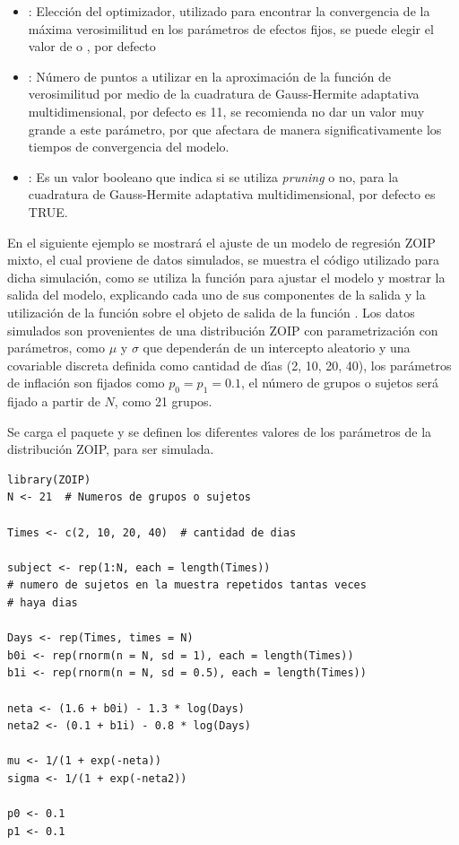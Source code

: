 \begin{itemize}[noitemsep, nolistsep]
\item {}: Elecci\'{o}n del optimizador, utilizado para encontrar la convergencia de la m\'{a}xima verosimilitud en los par\'{a}metros de efectos fijos, se puede elegir el valor de  o , por defecto 
\item {}: N\'{u}mero de puntos a utilizar en la aproximaci\'{o}n de la funci\'{o}n de ve\-ro\-si\-mi\-li\-tud por medio de la cuadratura de Gauss-Hermite adaptativa multidimensional, por defecto es 11, se recomienda no dar un valor muy grande a este par\'{a}metro, por que afectara de manera significativamente los tiempos de convergencia del modelo.
\item {}: Es un valor booleano que indica si se utiliza \textit{pruning} o no, para la cuadratura de Gauss-Hermite adaptativa multidimensional, por defecto es TRUE.

\end{itemize}

En el siguiente ejemplo se mostrar\'{a} el ajuste de un modelo de regresi\'{o}n ZOIP mixto, el cual proviene de datos simulados, se muestra el c\'{o}digo utilizado para dicha simulaci\'{o}n, como se utiliza la funci\'{o}n  para ajustar el modelo y mostrar la salida del modelo, explicando cada uno de sus componentes de la salida y la utilizaci\'{o}n de la funci\'{o}n  sobre el objeto de salida de la funci\'{o}n . Los datos simulados son provenientes de una distribuci\'{o}n ZOIP con parametrizaci\'{o}n \cite{Stasinopoulos2} con par\'{a}metros, como $\mu$ y $\sigma$ que depender\'{a}n de un intercepto aleatorio y una covariable discreta definida como cantidad de d\'{\i}as (2, 10, 20, 40), los par\'{a}metros de inflaci\'{o}n son fijados como $p_0=p_1=0.1$, el n\'{u}mero de grupos o sujetos ser\'{a} fijado a partir de $N$, como 21 grupos.

Se carga el paquete  y se definen los diferentes valores de los par\'{a}metros de la distribuci\'{o}n ZOIP, para ser simulada.
\begin{verbatim}
library(ZOIP)
N <- 21  # Numeros de grupos o sujetos

Times <- c(2, 10, 20, 40)  # cantidad de dias

subject <- rep(1:N, each = length(Times))
# numero de sujetos en la muestra repetidos tantas veces
# haya dias

Days <- rep(Times, times = N)
b0i <- rep(rnorm(n = N, sd = 1), each = length(Times))
b1i <- rep(rnorm(n = N, sd = 0.5), each = length(Times))

neta <- (1.6 + b0i) - 1.3 * log(Days)
neta2 <- (0.1 + b1i) - 0.8 * log(Days)

mu <- 1/(1 + exp(-neta))
sigma <- 1/(1 + exp(-neta2))

p0 <- 0.1
p1 <- 0.1
\end{verbatim}


